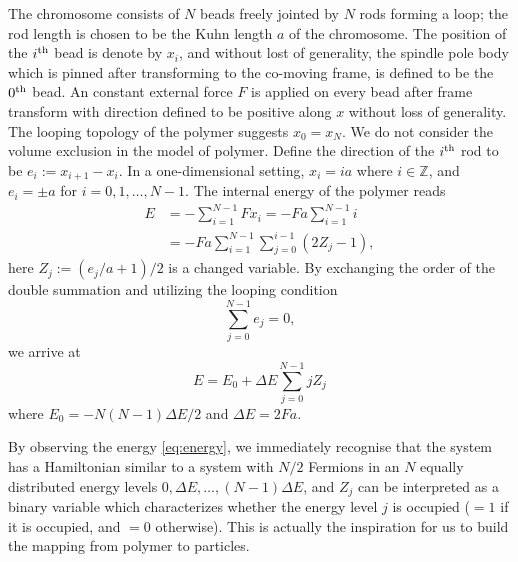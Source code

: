 \documentclass[aps,showpacs,twocolumn,floatfix,prx,superscriptaddress]{revtex4-1}
\begin{document}
The chromosome consists of $N$ beads freely jointed by $N$ rods forming
a loop; the rod length is chosen to be the Kuhn length $a$ of the chromosome.
The position of the $i^{\rm th}$ bead is denote by $x_i$, and without lost of
generality, the spindle pole body which is pinned after transforming to the
co-moving frame, is defined to be the $0^{\rm th}$ bead. An constant external
force $F$ is applied on every bead after frame transform with direction defined
to be positive along $x$ without loss of generality. The looping topology of
the polymer suggests $x_0=x_N$.  We do not consider the volume exclusion in the
model of polymer. Define the direction of the $i^{\rm th}$ rod to be
$e_i:=x_{i+1} - x_{i}$.  In a one-dimensional setting, $x_i = i a$ where $i \in
\mathbb{Z}$, and $e_i=\pm a$ for $i=0, 1, \ldots, N-1$. The internal energy of
the polymer reads
\begin{align*}
    E  & = -\sum_{i=1}^{N-1} {Fx_i} = -Fa\sum_{i=1}^{N-1} i  \nonumber \\
       & = - Fa \sum_{i=1}^{N-1} \sum_{j=0}^{i-1} \left(2 Z_j - 1\right),
\end{align*}
here $Z_j := \left(e_j/a+1\right)/2$ is a changed variable. By exchanging the
order of the double summation and utilizing the looping condition 
\begin{equation}
    \label{eq:looping}
    \sum_{j=0}^{N-1} e_j = 0,
\end{equation}
we arrive at 
\begin{equation}
    \label{eq:energy}
    E = E_0 + \Delta E \sum_{j=0}^{N-1} j Z_j
\end{equation}
where $E_0= - N(N-1) \Delta E /2$ and $\Delta E = 2Fa$. 

By observing the energy \eqref{eq:energy}, we immediately recognise that the
system has a Hamiltonian similar to a system with $N/2$ Fermions in an $N$
equally distributed energy levels $0, \Delta E, \ldots, (N-1) \Delta E$, and
$Z_j$ can be interpreted as a binary variable which characterizes whether the
energy level $j$ is occupied ($=1$ if it is occupied, and $=0$ otherwise). 
This is actually the inspiration for us to build the mapping from polymer to
particles. 
\end{document}
